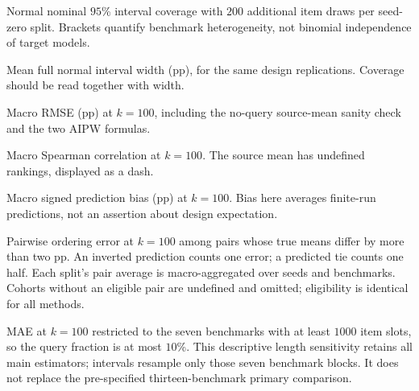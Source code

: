 \documentclass{article}
\begin{document}
\begin{table}[p]
\centering\small
\caption{Normal nominal $95$\% interval coverage with $200$ additional item draws per seed-zero split. Brackets quantify benchmark heterogeneity, not binomial independence of target models.}

\end{table}
\begin{table}[p]
\centering\small
\caption{Mean full normal interval width (pp), for the same design replications. Coverage should be read together with width.}

\end{table}
\begin{table}[p]\centering\small
\caption{Macro RMSE (pp) at $k=100$, including the no-query source-mean sanity check and the two AIPW formulas.}

\end{table}
\begin{table}[p]\centering\small
\caption{Macro Spearman correlation at $k=100$. The source mean has undefined rankings, displayed as a dash.}\label{tab:allrho}

\end{table}
\begin{table}[p]\centering\small
\caption{Macro signed prediction bias (pp) at $k=100$. Bias here averages finite-run predictions, not an assertion about design expectation.}

\end{table}
\begin{table}[p]\centering\small
\caption{Pairwise ordering error at $k=100$ among pairs whose true means differ by more than two pp. An inverted prediction counts one error; a predicted tie counts one half. Each split's pair average is macro-aggregated over seeds and benchmarks. Cohorts without an eligible pair are undefined and omitted; eligibility is identical for all methods.}

\end{table}
\begin{table}[p]\centering\small
\caption{MAE at $k=100$ restricted to the seven benchmarks with at least $1000$ item slots, so the query fraction is at most $10$\%. This descriptive length sensitivity retains all main estimators; intervals resample only those seven benchmark blocks. It does not replace the pre-specified thirteen-benchmark primary comparison.}

\end{table}

\clearpage
\end{document}
